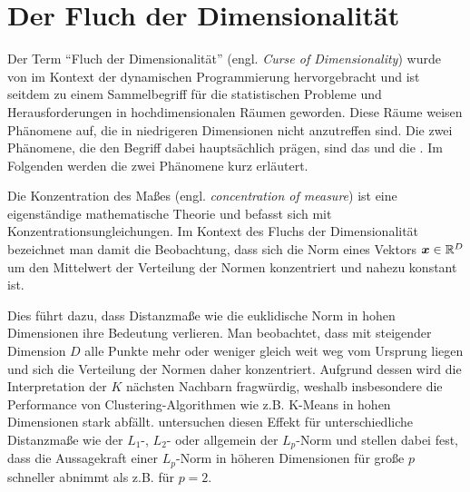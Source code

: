 \section{Der Fluch der Dimensionalität}
\label{ch:Dimensionsreduktion:FluchDerDim}

Der Term \enquote{Fluch der Dimensionalität} (engl. \textit{Curse of Dimensionality}) wurde von
\textcite{Bellman.1957} im Kontext der dynamischen Programmierung hervorgebracht und ist seitdem zu
einem Sammelbegriff für die statistischen Probleme und Herausforderungen in hochdimensionalen
Räumen geworden. Diese Räume weisen Phänomene auf, die in niedrigeren Dimensionen nicht anzutreffen
sind. Die zwei Phänomene, die den Begriff dabei hauptsächlich prägen, sind das  und die  \parencite[6 -- 9]{Lee.2007}. Im Folgenden werden die zwei Phänomene kurz erläutert.

Die Konzentration des Maßes (engl. \textit{concentration of measure}) \parencite{Ledoux.2001} ist eine eigenständige mathematische Theorie und befasst sich mit
Konzentrationsungleichungen. Im Kontext des Fluchs der Dimensionalität bezeichnet man damit die
Beobachtung, dass sich die Norm eines Vektors $\bm{x} \in \mathbb{R}^D$ um den Mittelwert der
Verteilung der Normen konzentriert und nahezu konstant ist.

Dies führt dazu, dass Distanzmaße wie die euklidische Norm in hohen Dimensionen ihre Bedeutung
verlieren. Man beobachtet, dass mit steigender Dimension $D$ alle Punkte mehr oder weniger gleich
weit weg vom Ursprung liegen und sich die Verteilung der Normen daher konzentriert. Aufgrund dessen
wird die Interpretation der $K$ nächsten Nachbarn fragwürdig, weshalb insbesondere die Performance
von Clustering-Algorithmen wie z.B. K-Means in hohen Dimensionen stark abfällt.
\textcite{Aggarwal.2001} untersuchen diesen Effekt für unterschiedliche Distanzmaße wie der $L_1$-,
$L_2$- oder allgemein der $L_p$-Norm und stellen dabei fest, dass die Aussagekraft einer $L_p$-Norm
in höheren Dimensionen für große $p$ schneller abnimmt als z.B. für $p = 2$.

